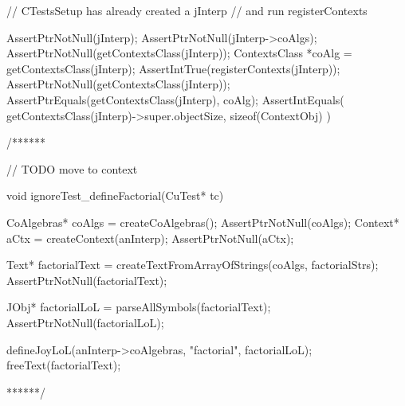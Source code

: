
\startCTest
  // CTestsSetup has already created a jInterp
  // and run registerContexts
  
  AssertPtrNotNull(jInterp);
  AssertPtrNotNull(jInterp->coAlgs);
  AssertPtrNotNull(getContextsClass(jInterp));
  ContextsClass *coAlg = getContextsClass(jInterp);
  AssertIntTrue(registerContexts(jInterp));
  AssertPtrNotNull(getContextsClass(jInterp));
  AssertPtrEquals(getContextsClass(jInterp), coAlg);
  AssertIntEquals(
    getContextsClass(jInterp)->super.objectSize,
    sizeof(ContextObj)
  )
\stopCTest

\stopTestCase
\stopTestSuite


\starttyping
/******

// TODO move to context


void ignoreTest_defineFactorial(CuTest* tc) {
  CoAlgebras* coAlgs = createCoAlgebras();
  AssertPtrNotNull(coAlgs);
  Context* aCtx = createContext(anInterp);
  AssertPtrNotNull(aCtx);

  Text* factorialText = createTextFromArrayOfStrings(coAlgs, factorialStrs);
  AssertPtrNotNull(factorialText);

  JObj* factorialLoL = parseAllSymbols(factorialText);
  AssertPtrNotNull(factorialLoL);

  defineJoyLoL(anInterp->coAlgebras, "factorial", factorialLoL);
  freeText(factorialText);
}
******/
\stoptyping
